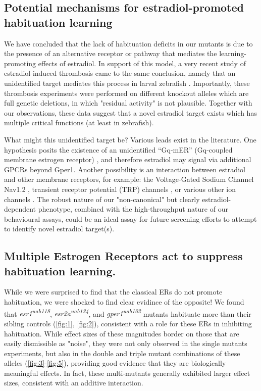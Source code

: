 \documentclass[10pt,lineno]{RandlettLab_elife}
\begin{document}
{\subsection{Potential mechanisms for estradiol-promoted habituation learning}

We have concluded that the lack of habituation deficits in our mutants is due to the presence of an alternative receptor or pathway that mediates the learning-promoting effects of estradiol.
In support of this model, a very recent study of estradiol-induced thrombosis came to the same conclusion, namely that an unidentified target mediates this process in larval zebrafish \citep{Yu2024-hr}.
Importantly, these thrombosis experiments were performed on different knockout alleles which are full genetic deletions, in which "residual activity" is not plausible. 
Together with our observations, these data suggest that a novel estradiol target exists which has multiple critical functions (at least in zebrafish). 

What might this unidentified target be? 
Various leads exist in the literature. 
One hypothesis posits the existence of an unidentified “Gq-mER” (Gq-coupled membrane estrogen receptor) \citep{Qiu2006-ml, Vail2019-lx}, and therefore estradiol may signal via additional GPCRs beyond Gper1. 
Another possibility is an interaction between estradiol and other membrane receptors, for example: the Voltage-Gated Sodium Channel Nav1.2 \citep{Sula2021-vs, Trevino2021-wl}, transient receptor potential (TRP) channels \citep{Payrits2017-cd, Ramirez-Barrantes2020-iv}, or various other ion channels \citep{Kow2016-dl}.
The robust nature of our "non-canonical" but clearly estradiol-dependent phenotype, combined with the high-throughput nature of our behavioural assays, could be an ideal assay for future screening efforts to attempt to identify novel estradiol target(s). 

\subsection{Multiple Estrogen Receptors act to suppress habituation learning.}
 
While we were surprised to find that the classical ERs do not promote habituation, we were shocked to find clear evidince of the opposite!
We found that \emph{esr1\textsuperscript{uab118}}, \emph{esr2a\textsuperscript{uab134}},  and \emph{gper1\textsuperscript{uab102}} mutants habituate more than their sibling controls (\autoref{fig:1}, \autoref{fig:2}), consistent with a role for these ERs in inhibiting habituation.
While effect sizes of these magnitudes border on those that are easily dismissible as "noise", they were not only observed in the single mutants experiments, but also in the double and triple mutant combinations of these alleles (\autoref{fig:3}-\autoref{fig:5}), providing good evidence that they are biologically meaningful effects. 
In fact, these multi-mutants generally exhibited larger effect sizes, consistent with an additive interaction. 
 
}
\end{document}
